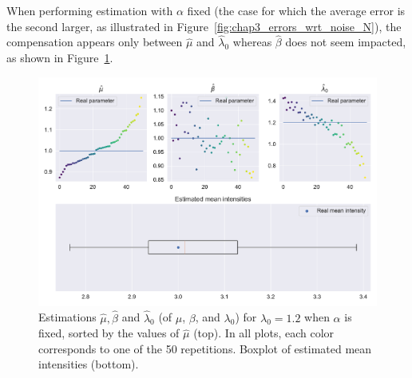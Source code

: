     When performing estimation with $\alpha$ fixed (the case for which the average error is the second larger, as illustrated in Figure~\ref{fig:chap3_errors_wrt_noise_N}), the compensation appears only between $\hat \mu$ and $\hat \lambda_0$ whereas $\hat \beta$ does not seem impacted, as shown in Figure~\ref{fig:chap3_uni_compensation_alpha_N}.

        \begin{figure}[!ht]
        \centering
        \includegraphics[width=\textwidth]{images/chapter4//compensation_alpha_N.pdf}
        \caption{Estimations $\hat \mu, \hat \beta$ and $\hat \lambda_0$ (of $\mu$, $\beta$, and $\lambda_0$) for
        $\lambda_0 = 1.2$ when $\alpha$ is fixed,
        sorted by the values of $\hat{\mu}$ (top).
        In all plots, each color corresponds to one of the 50 repetitions. Boxplot of estimated mean intensities (bottom).}
        \label{fig:chap3_uni_compensation_alpha_N}
        \end{figure}


     
        
